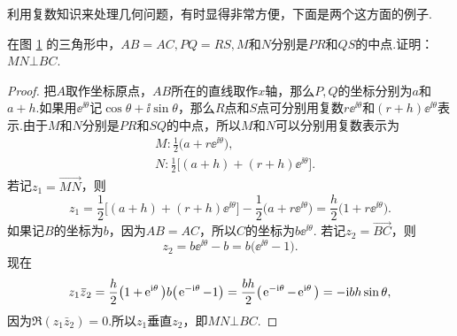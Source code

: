利用复数知识来处理几何问题，有时显得非常方便，下面是两个这方面的例子.
\begin{example}
  在图 \ref{fig1.3} 的三角形中，$AB=AC,PQ=RS,M$和$N$分别是$PR$和$QS$的中点.证明： $MN\bot BC$.
\end{example}
\begin{figure}[!ht]
  \centering
  \caption{}\label{fig1.3}
\end{figure}
\begin{proof}
把$A$取作坐标原点，$AB$所在的直线取作$x$轴，那么$P,Q$的坐标分别为$a$和$a+h$.如果用$\ee^{\ii\theta} $记$\cos\theta+\ii\sin\theta$，那么$R$点和$S$点可分别用复数$r\ee^{\ii\theta}$和$(r+h)\ee^{\ii\theta}$表示.由于$M$和$N$分别是$PR$和$SQ$的中点，所以$M$和$N$可以分别用复数表示为
\begin{align*}
  & M: \frac12 \big( a + r\ee^{\ii\theta} \big),\\
  & N: \frac12 \big[ (a + h) + (r + h)\ee^{\ii\theta} \big].
\end{align*}
若记$z_1=\overrightarrow{MN}$，则
\[
  z_1 = \frac12 \big[ (a + h) + (r + h)\ee^{\ii\theta} \big] - \frac12 \big( a + r\ee^{\ii\theta} \big) =
  \frac h2 \big( 1 + r\ee^{\ii\theta} \big).
\]
如果记$B$的坐标为$b$，因为$AB=AC$，所以$C$的坐标为$b\ee^{\ii\theta}$. 若记$z_2=\overrightarrow{BC}$，则
\[
  z_2 = b\ee^{\ii\theta} - b = b\big( \ee^{\ii\theta} - 1 \big).
\]
现在
\[
  z_1\bar z_2 = \frac h2 \big( 1 + \ee^{\ii\theta} \big)b \big( \ee^{-\ii\theta} - 1 \big)\\
  = \frac{bh}2 \big( \ee^{-\ii\theta} - \ee^{\ii\theta} \big) = -\ii bh\sin\theta,
\]
因为$\Re(z_1\bar z_2)=0$.所以$z_1$垂直$z_2$，即$MN\bot BC$.
\end{proof}


